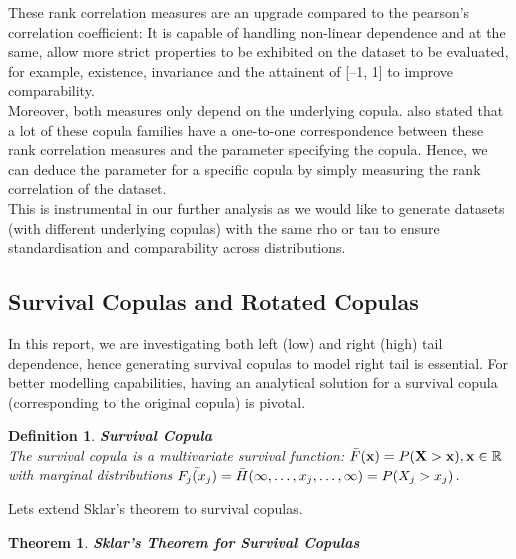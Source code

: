 \documentclass[12pt]{report}
\newtheorem{theorem}{Theorem}[subsection]
\newtheorem{definition}{Definition}[subsection]
\newcommand{\1}{\mathbf{1}}
\begin{document}
\begin{flushleft}
These rank correlation measures are an upgrade compared to the pearson's correlation coefficient: It is capable of handling non-linear dependence and at the same, allow more strict properties to be exhibited on the dataset to be evaluated, for example, existence, invariance and the attainent of [--1, 1] to improve comparability. \\
\vspace{0.5cm}
Moreover, both measures only depend on the underlying copula. \cite{HofertBook} also stated that a lot of these copula families have a one-to-one correspondence between these rank correlation measures and the parameter specifying the copula. Hence, we can deduce the parameter for a specific copula by simply measuring the rank correlation of the dataset.\\
\vspace{0.5cm}
This is instrumental in our further analysis as we would like to generate datasets (with different underlying copulas) with the same rho or tau to ensure standardisation and comparability across distributions.

\newpage
\subsection{Survival Copulas and Rotated Copulas}
\vspace{0.5cm}
In this report, we are investigating both left (low) and right (high) tail dependence, hence generating survival copulas to model right tail is essential. For better modelling capabilities, having an analytical solution for a survival copula (corresponding to the original copula) is pivotal.

\begin{definition}\label{SurvivalCopulaDefinition}
\textbf{Survival Copula} \\
The survival copula is a multivariate survival function: $\Bar{F}(\textbf{x}) = P(\textbf{X} > \textbf{x}), \textbf{x} \in \mathbb{R}$ with marginal distributions $\Bar{F_{j}(x_{j})} = \Bar{H}(\infty, \dots, x_{j}, \dots, \infty) = P(X_{j} > x_{j})$.
\end{definition}

Lets extend Sklar's theorem to survival copulas.

\begin{theorem}\label{SklarTheoremSurvival}
\textit{\normalfont\parencite{HofertBook}}
\:\textbf{Sklar's Theorem for Survival Copulas} \\
\begin{enumerate}


\end{enumerate}
\end{theorem}
\end{flushleft}
\end{document}
